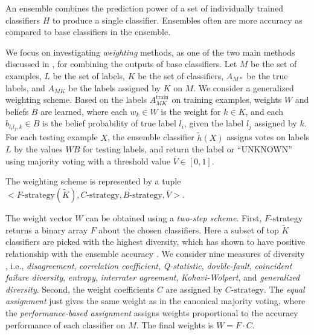An ensemble combines the prediction power of a set of individually trained classifiers $H$ to produce a single classifier. Ensembles often are more accuracy as compared to base classifiers in the ensemble. %

We focus on investigating \emph{weighting} methods, as one of the two main methods discussed in \cite{rokach2010ensemble}, for combining the outputs of base classifiers. Let $M$ be the set of examples, $L$ be the set of labels, $K$ be the set of classifiers, $A_{M*}$ be the true labels, and $A_{MK}$ be the labels assigned by $K$ on $M$. We consider a generalized weighting scheme. Based on the labels $A_{MK}^\text{train}$ on training examples, weights $W$ and beliefs $B$ are learned, where each $w_k \in W$ is the weight for $k\in K$, and each $b_{l_il_j,k} \in B$ is the belief probability of true label $l_i$, given the label $l_j$ assigned by $k$. For each testing example $X$, the ensemble classifier $\tilde{h}(X)$ assigns votes on labels $L$ by the values $WB$ for testing labels, and return the label or ``UNKNOWN'' using majority voting with a threshold value $\bar{V} \in [0, 1]$.

The weighting scheme is represented by a tuple $<F\text{-strategy}(\tilde{K}), C\text{-strategy}, B\text{-strategy}, \bar{V}>$.

The weight vector $W$ can be obtained using a \emph{two-step scheme}. First, $F\text{-strategy}$ returns a binary array $F$ about the chosen classifiers. Here a subset of top $\tilde{K}$ classifiers are picked with the highest diversity, which has shown to have positive relationship with the ensemble accuracy \cite{kuncheva2003measures}. We consider nine measures of diversity \cite{kuncheva2003measures}, i.e., \emph{disagreement}, \emph{correlation coefficient}, \emph{Q-statistic}, \emph{double-fault}, \emph{coincident failure diversity}, \emph{entropy}, \emph{interrater agreement}, \emph{Kohavi-Wolpert}, and \emph{generalized diversity}. Second, the weight coefficients $C$ are assigned by $C\text{-strategy}$. The \emph{equal assignment} just gives the same weight as in the canonical majority voting, where the \emph{performance-based assignment} \cite{opitz1996generating} assigns weights proportional to the accuracy performance of each classifier on $M$. The final weights is $W=F\cdot C$.

